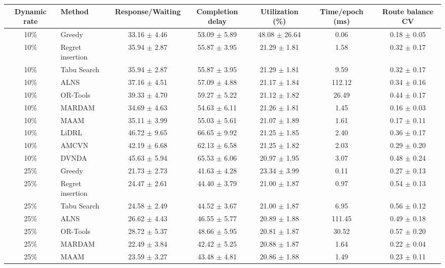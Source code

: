 \begin{tabular}{clccccc}
\toprule
Dynamic rate & Method & Response/Waiting & Completion delay & Utilization (\%) & Time/epoch (ms) & Route balance CV \\
\midrule
10\% & Greedy & 33.16 $\pm$ 4.46 & 53.09 $\pm$ 5.89 & 48.08 $\pm$ 26.64 & 0.06 & 0.18 $\pm$ 0.05 \\
10\% & Regret insertion & 35.94 $\pm$ 2.87 & 55.87 $\pm$ 3.95 & 21.29 $\pm$ 1.81 & 1.58 & 0.32 $\pm$ 0.17 \\
10\% & Tabu Search & 35.94 $\pm$ 2.87 & 55.87 $\pm$ 3.95 & 21.29 $\pm$ 1.81 & 9.59 & 0.32 $\pm$ 0.17 \\
10\% & ALNS & 37.16 $\pm$ 4.51 & 57.09 $\pm$ 4.88 & 21.17 $\pm$ 1.84 & 112.12 & 0.34 $\pm$ 0.16 \\
10\% & OR-Tools & 39.33 $\pm$ 4.70 & 59.27 $\pm$ 5.22 & 21.12 $\pm$ 1.82 & 26.49 & 0.44 $\pm$ 0.17 \\
10\% & MARDAM & 34.69 $\pm$ 4.63 & 54.63 $\pm$ 6.11 & 21.26 $\pm$ 1.81 & 1.45 & 0.16 $\pm$ 0.03 \\
10\% & MAAM & 35.11 $\pm$ 3.99 & 55.03 $\pm$ 5.61 & 21.07 $\pm$ 1.89 & 1.61 & 0.17 $\pm$ 0.11 \\
10\% & LiDRL & 46.72 $\pm$ 9.65 & 66.65 $\pm$ 9.92 & 21.25 $\pm$ 1.85 & 2.40 & 0.36 $\pm$ 0.17 \\
10\% & AMCVN & 42.19 $\pm$ 6.68 & 62.13 $\pm$ 6.58 & 21.25 $\pm$ 1.82 & 2.03 & 0.29 $\pm$ 0.20 \\
10\% & DVNDA & 45.63 $\pm$ 5.94 & 65.53 $\pm$ 6.06 & 20.97 $\pm$ 1.95 & 3.07 & 0.48 $\pm$ 0.24 \\
25\% & Greedy & 21.73 $\pm$ 2.73 & 41.63 $\pm$ 4.28 & 23.34 $\pm$ 3.99 & 0.11 & 0.27 $\pm$ 0.13 \\
25\% & Regret insertion & 24.47 $\pm$ 2.61 & 44.40 $\pm$ 3.79 & 21.00 $\pm$ 1.87 & 0.97 & 0.54 $\pm$ 0.13 \\
25\% & Tabu Search & 24.58 $\pm$ 2.49 & 44.52 $\pm$ 3.67 & 21.00 $\pm$ 1.87 & 6.95 & 0.56 $\pm$ 0.12 \\
25\% & ALNS & 26.62 $\pm$ 4.43 & 46.55 $\pm$ 5.77 & 20.89 $\pm$ 1.88 & 111.45 & 0.49 $\pm$ 0.18 \\
25\% & OR-Tools & 28.72 $\pm$ 5.37 & 48.66 $\pm$ 5.95 & 20.81 $\pm$ 1.87 & 30.52 & 0.57 $\pm$ 0.20 \\
25\% & MARDAM & 22.49 $\pm$ 3.84 & 42.42 $\pm$ 5.25 & 20.88 $\pm$ 1.87 & 1.64 & 0.22 $\pm$ 0.04 \\
25\% & MAAM & 23.59 $\pm$ 3.27 & 43.48 $\pm$ 4.81 & 20.86 $\pm$ 1.88 & 1.49 & 0.23 $\pm$ 0.11 \\

\end{tabular}
